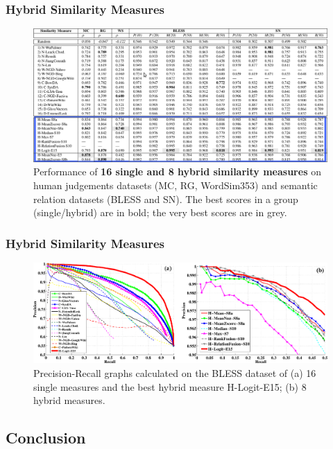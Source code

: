 \documentclass{beamer}
\begin{document}
\begin{frame}
\frametitle{Hybrid Similarity Measures}

	\begin{figure}
	\centering
		\includegraphics[width=1.0\textwidth]{figures/table-hybrid-hybrid}
		
		\caption{ Performance of \textbf{16 single and 8 hybrid similarity measures} on human judgements datasets (MC, RG,
WordSim353) and semantic relation datasets (BLESS and SN). The best scores in a group (single/hybrid) are in
bold; the very best scores are in grey. }
\end{figure}
	
	
\end{frame}

\begin{frame}
 \frametitle{Hybrid Similarity Measures}
	\begin{figure}
	\centering
		\includegraphics[width=1.0\textwidth]{figures/pr}
		\caption{Precision-Recall graphs calculated on the BLESS dataset of (a) 16 single measures and the best hybrid
measure H-Logit-E15; (b) 8 hybrid measures.}
\end{figure}
	
\end{frame}

\subsection{Conclusion}
\end{document}

